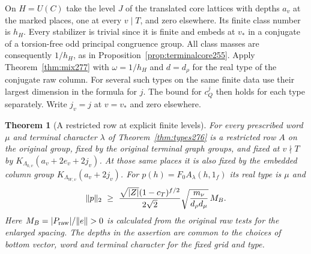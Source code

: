 \documentclass[a4paper,11pt]{article}
\newtheorem{theorem}[proposition]{Theorem}
\theoremstyle{definition}
\theoremstyle{remark}
\numberwithin{equation}{section}
\begin{document}
On \(H=U(C)\) take the level \(J\) of the translated core
lattices with depths \(a_v\) at the marked places, one at
every \(v\mid T\), and zero elsewhere. Its finite class number
is \(h_H\). Every stabilizer is trivial since it is finite
and embeds at \(v_*\) in a conjugate of a torsion-free odd
principal congruence group. All class masses are consequently
\(1/h_H\), as in Proposition~\ref{prop:terminalcore255}.
Apply Theorem~\ref{thm:mix277} with \(\omega=1/h_H\) and
\(d=d_\rho\) for the real type of the conjugate raw column.
For several such types on the same finite data use their
largest dimension in the formula for \(j\). The bound for
\(c_Q^j\) then holds for each type separately.
Write \(j_v=j\) at \(v=v_*\) and zero elsewhere.

\begin{theorem}[A restricted row at explicit finite levels]\leavevmode
\label{thm:row277}
For every prescribed word \(\mu\) and terminal character
\(\lambda\) of Theorem~\ref{thm:types276} is a restricted
row \(A\) on the original group, fixed by the original
terminal graph groups, and fixed at \(v\nmid T\) by
\(K_{\Lambda_{0,v}}(a_v+2e_v+2j_v)\).
At those same places it is also fixed by the embedded column
group \(K_{\Lambda_{W,v}}(a_v+2j_v)\).
For \(p(h)=F_0A_\lambda(h,1_f)\) its real type is \(\mu\) and
\[
 \|p\|_2\ \ge\
 {\sqrt{|Z|}(1-c_T)^{f/2}\over 2\sqrt{2}}
       \sqrt{\frac{m_\nu}{d_\rho d_\mu}}\,M_B .
\]
Here \(M_B=|P_{\rm raw}|/\|e\|>0\) is calculated from the
original raw tests for the enlarged spacing. The depths in
the assertion are common to the choices of bottom vector,
word and terminal character for the fixed grid and type.
\end{theorem}
\end{document}
